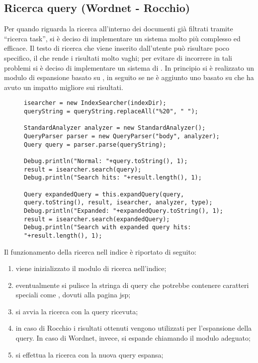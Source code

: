 \subsection{Ricerca query (Wordnet - Rocchio)}
Per quando riguarda la ricerca all'interno dei documenti già filtrati tramite ``ricerca task'', si è deciso di implementare un sistema molto più complesso ed efficace. Il testo di ricerca che viene inserito dall'utente può risultare poco specifico, il che rende i risultati molto vaghi; per evitare di incorrere in tali problemi si è deciso di implementare un sistema di . In principio si è realizzato un modulo di espansione basato su , in seguito se ne è aggiunto uno basato su  che ha avuto un impatto migliore sui risultati.
\begin{figure}[H]
\begin{lstlisting}[frame=trBL]
isearcher = new IndexSearcher(indexDir);
queryString = queryString.replaceAll("%20", " ");

StandardAnalyzer analyzer = new StandardAnalyzer();
QueryParser parser = new QueryParser("body", analyzer);
Query query = parser.parse(queryString);

Debug.println("Normal: "+query.toString(), 1);
result = isearcher.search(query);
Debug.println("Search hits: "+result.length(), 1);

Query expandedQuery = this.expandQuery(query, query.toString(), result, isearcher, analyzer, type);
Debug.println("Expanded: "+expandedQuery.toString(), 1);
result = isearcher.search(expandedQuery);
Debug.println("Search with expanded query hits: "+result.length(), 1);
\end{lstlisting}
\end{figure}
Il funzionamento della ricerca nell indice è riportato di seguito:
\begin{enumerate}
\item viene inizializzato il modulo di ricerca nell'indice;
\item eventualmente si pulisce la stringa di query che potrebbe contenere caratteri speciali come , dovuti alla pagina jsp;
\item si avvia la ricerca con la query ricevuta;
\item in caso di Rocchio i risultati ottenuti vengono utilizzati per l'espansione della query. In caso di Wordnet, invece, si espande chiamando il modulo adeguato;
\item si effettua la ricerca con la nuova query espansa;
\end{enumerate}
